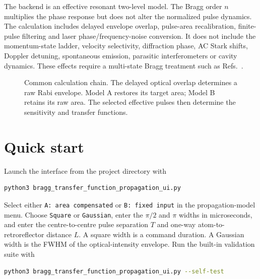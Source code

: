 \documentclass[11pt,a4paper]{article}
\newcommand{\Hatom}{H_{\mathrm{AI}}}
\newcommand{\Hsrc}{H_{\mathrm{src}\phi}}
\newcommand{\Hnu}{H_{\nu}}
\newcommand{\taud}{\tau_{d}}
\begin{document}
The backend is an effective resonant two-level model. The Bragg order $n$ multiplies the phase response but does not alter the normalized pulse dynamics. The calculation includes delayed envelope overlap, pulse-area recalibration, finite-pulse filtering and laser phase/frequency-noise conversion. It does not include the momentum-state ladder, velocity selectivity, diffraction phase, AC Stark shifts, Doppler detuning, spontaneous emission, parasitic interferometers or cavity dynamics. These effects require a multi-state Bragg treatment such as Refs.~\cite{Siemss2020,Jenewein2022}.

\begin{figure}[H]
\centering
{}
\caption{Common calculation chain. The delayed optical overlap determines a raw Rabi envelope. Model A restores its target area; Model B retains its raw area. The selected effective pulses then determine the sensitivity and transfer functions.}
\label{fig:workflow}
\end{figure}

\section{Quick start}

Launch the interface from the project directory with
\begin{lstlisting}[language=bash]
python3 bragg_transfer_function_propagation_ui.py
\end{lstlisting}
Select either \texttt{A: area compensated} or \texttt{B: fixed input} in the propagation-model menu. Choose \texttt{Square} or \texttt{Gaussian}, enter the $\pi/2$ and $\pi$ widths in microseconds, and enter the centre-to-centre pulse separation $T$ and one-way atom-to-retroreflector distance $L$. A square width is a command duration. A Gaussian width is the FWHM of the optical-intensity envelope. Run the built-in validation suite with
\begin{lstlisting}[language=bash]
python3 bragg_transfer_function_propagation_ui.py --self-test
\end{lstlisting}
\end{document}
